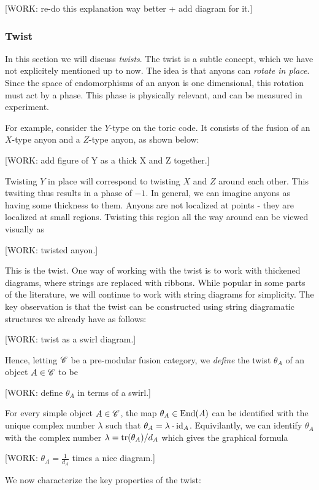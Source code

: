 [WORK: re-do this explanation way better + add diagram for it.]

\subsubsection{Twist}

In this section we will discuss \textit{twists}. The twist is a subtle concept, which we have not explicitely mentioned up to now. The idea is that anyons can \textit{rotate in place}. Since the space of endomorphisms of an anyon is one dimensional, this rotation must act by a phase. This phase is physically relevant, and can be measured in experiment.

For example, consider the $Y$-type on the toric code. It consists of the fusion of an $X$-type anyon and a $Z$-type anyon, as shown below:

[WORK: add figure of Y as a thick X and Z together.]

Twisting $Y$ in place will correspond to twisting $X$ and $Z$ around each other. This twsiting thus results in a phase of $-1$. In general, we can imagine anyons as having some thickness to them. Anyons are not localized at points - they are localized at small regions. Twisting this region all the way around can be viewed visually as

[WORK: twisted anyon.]

This is the twist. One way of working with the twist is to work with thickened diagrams, where strings are replaced with ribbons. While popular in some parts of the literature, we will continue to work with string diagrams for simplicity. The key observation is that the twist can be constructed using string diagramatic structures we already have as follows:

[WORK: twist as a swirl diagram.]

Hence, letting $\mathscr{C}$ be a pre-modular fusion category, we \textit{define} the twist $\theta_{A}$ of an object $A\in \mathscr{C}$ to be

[WORK: define $\theta_A$ in terms of a swirl.]

For every simple object $A\in \mathscr{C}$, the map $\theta_A\in \operatorname{End}(A)$ can be identified with the unique complex number $\lambda$ such that $\theta_A=\lambda\cdot \operatorname{id}_A$. Equivilantly, we can identify $\theta_A$ with the complex number $\lambda=\operatorname{tr}(\theta_A)/d_A$ which gives the graphical formula

[WORK: $\theta_A=\frac{1}{d_A}$ times a nice diagram.]

We now characterize the key properties of the twist:

